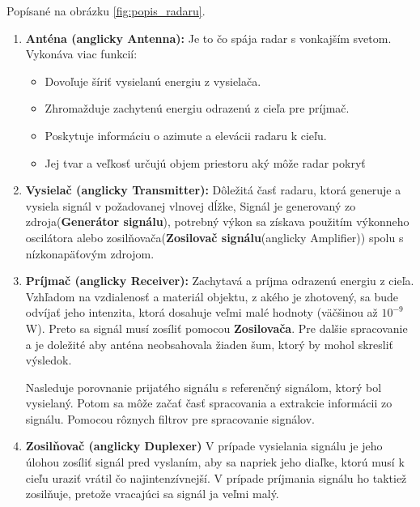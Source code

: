     Popísané na obrázku \ref{fig:popis_radaru}.
    \begin{enumerate}
      \item \textbf{Anténa (anglicky Antenna):} Je to čo spája radar s vonkajším svetom. Vykonáva viac funkcií: \begin{itemize}
          \item Dovoľuje šíriť vysielanú energiu z vysielača.
          \item Zhromažduje zachytenú energiu odrazenú z cieľa pre príjmač.
          \item Poskytuje informáciu o azimute a elevácii radaru k cieľu.
          \item Jej tvar a veľkosť určujú objem priestoru aký môže radar pokryť
        \end{itemize}
      \item \textbf{Vysielač (anglicky Transmitter):} Dôležitá časť radaru, ktorá generuje a vysiela signál v požadovanej vlnovej dĺžke, Signál je generovaný zo zdroja(\textbf{Generátor signálu}), potrebný výkon sa získava použitím výkonneho oscilátora alebo zosilňovača(\textbf{Zosilovač signálu}(anglicky Amplifier)) spolu s nízkonapäťovým zdrojom.    
      \item \textbf{Príjmač (anglicky Receiver):} Zachytavá a príjma odrazenú energiu z cieľa. Vzhľadom na vzdialenosť a materiál objektu, z akého je zhotovený, sa bude odvíjať jeho intenzita, ktorá dosahuje veľmi malé hodnoty (väčšinou až $10^{-9}$ W). Preto sa signál musí zosíliť pomocou \textbf{Zosilovača}. Pre dalšie spracovanie a je doležité aby anténa neobsahovala žiaden šum, ktorý by mohol skresliť výsledok.
      
      Nasleduje porovnanie prijatého signálu s referenčný signálom, ktorý bol vysielaný. Potom sa môže začať časť spracovania a extrakcie informácii zo signálu. Pomocou rôznych filtrov pre spracovanie signálov.
      \item \textbf{Zosilňovač (anglicky Duplexer)} V prípade vysielania signálu je jeho úlohou zosíliť signál pred vyslaním, aby sa napriek jeho diaľke, ktorú musí k cieľu uraziť vrátil čo najintenzívnejší. V prípade príjmania signálu ho taktiež zosilňuje, pretože vracajúci sa signál ja veľmi malý.    
    \end{enumerate}

